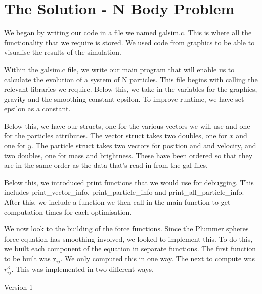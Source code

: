 \documentclass{article}
\begin{document}
\section{The Solution - N Body Problem}
We began by writing our code in a file we named galsim.c. This is where all the functionality that we require is stored. We used code from graphics to be able to visualise the results of the simulation.\vspace{0.3cm}

Within the galsim.c file, we write our main program that will enable us to calculate the evolution of a system of N particles. This file begins with calling the relevant libraries we require. Below this, we take in the variables for the graphics, gravity and the smoothing constant epsilon. To improve runtime, we have set epsilon as a constant.\vspace{0.3cm}

Below this, we have our structs, one for the various vectors we will use and one for the particles attributes. The vector struct takes two doubles, one for $x$ and one for $y$. The particle struct takes two vectors for position and and velocity, and two doubles, one for mass and brightness. These have been ordered so that they are in the same order as the data that's read in from the gal-files.\vspace{0.3cm}

Below this, we introduced print functions that we would use for debugging. This includes print\_vector\_info, print\_particle\_info and print\_all\_particle\_info. After this, we include a function we then call in the main function to get computation times for each optimisation.\vspace{0.3cm}

We now look to the building of the force functions. Since the Plummer spheres force equation has smoothing involved, we looked to implement this. To do this, we built each component of the equation in separate functions. The first function to be built was $\boldsymbol{r}_{ij}$. We only computed this in one way. The next to compute was $r_{ij}^{3}$. This was implemented in two different ways.
\begin{center}
    Version 1
\end{center}
\end{document}
